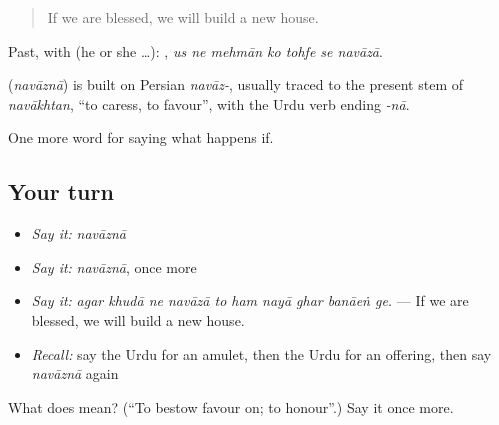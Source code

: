 \begin{quote}
If we are blessed, we will build a new house.
\end{quote}

Past, with  (he or she …):       , \emph{us ne mehmān ko tohfe se navāzā}.

\begin{cousinweb}
\textbf{} (\emph{navāznā}) is built on Persian \emph{navāz-}, usually traced to the present stem of \emph{navākhtan}, \textquotedblleft{}to caress, to favour\textquotedblright{}, with the Urdu verb ending \emph{-nā}.
\end{cousinweb}

\begin{grammarlens}[title={What you've built}]
One more word for saying what happens if.
\end{grammarlens}

\subsection*{Your turn}
\begin{itemize}
\raggedright
  \item \emph{Say it:} \emph{navāznā}
  \item \emph{Say it:} \emph{navāznā}, once more
  \item \emph{Say it:} \emph{agar khudā ne navāzā to ham nayā ghar banāeṅ ge.} — If we are blessed, we will build a new house.
  \item \emph{Recall:} say the Urdu for an amulet, then the Urdu for an offering, then say \emph{navāznā} again
\end{itemize}

\begin{tcolorbox}[breakable,colback=teal!4,colframe=teal!35!black,title={Before you move on}]
What does  mean? (\textquotedblleft{}To bestow favour on; to honour\textquotedblright{}.) Say it once more.
\end{tcolorbox}
